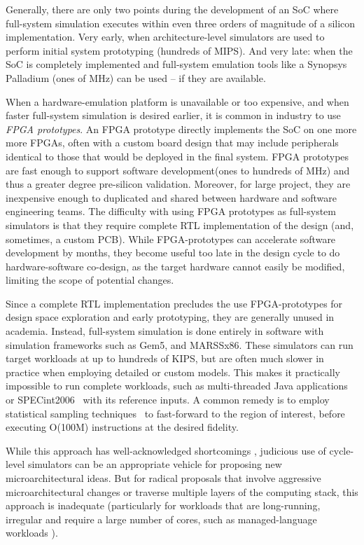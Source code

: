 Generally, there are only two points during the development of an SoC where
full-system simulation executes within even three orders of magnitude of a
silicon implementation. Very early, when architecture-level simulators are used
to perform initial system prototyping (hundreds of MIPS). And very late: when
the SoC is completely implemented and full-system emulation tools like a
Synopsys Palladium\cite{palladium} (ones of MHz) can be used -- if they are
available.

When a hardware-emulation platform is unavailable or too expensive, and when
faster full-system simulation is desired earlier, it is common in industry to
use \emph{FPGA prototypes}. An FPGA prototype directly implements the SoC on
one more more FPGAs, often with a custom board design that may include
peripherals identical to those that would be deployed in the final system. FPGA
prototypes are fast enough to support software development(ones to hundreds of
MHz) and thus a greater degree pre-silicon validation. Moreover, for large
project, they are inexpensive enough to duplicated and shared between hardware
and software engineering teams.  The difficulty with using FPGA prototypes as
full-system simulators is that they require complete RTL implementation of the
design (and, sometimes, a custom PCB). While FPGA-prototypes can accelerate
software development by months, they become useful too late in the design cycle
to do hardware-software co-design, as the target hardware cannot easily be
modified, limiting the scope of potential changes.

Since a complete RTL implementation precludes the use FPGA-prototypes for
design space exploration and early prototyping, they are generally unused in
academia. Instead, full-system simulation is done entirely in software with
simulation frameworks such as Gem5\cite{gem5}, and MARSSx86\cite{marssx86}.
These simulators can run target workloads at up to hundreds of KIPS, but are
often much slower in practice when employing detailed or custom models. This
makes it practically impossible to run complete workloads, such as
multi-threaded Java applications or SPECint2006~\cite{spec} with its reference
inputs. A common remedy is to employ statistical sampling
techniques~\cite{smarts} to fast-forward to the region of interest, before
executing O(100M) instructions at the desired fidelity.

While this approach has well-acknowledged shortcomings \cite{gem5error},
judicious use of cycle-level simulators can be an appropriate vehicle for
proposing new microarchitectural ideas. But for radical proposals that involve
aggressive microarchitectural changes or traverse multiple layers of the
computing stack, this approach is inadequate (particularly for workloads that
are long-running, irregular and require a large number of cores, such as
managed-language workloads \cite{MicroSimPanel}).

